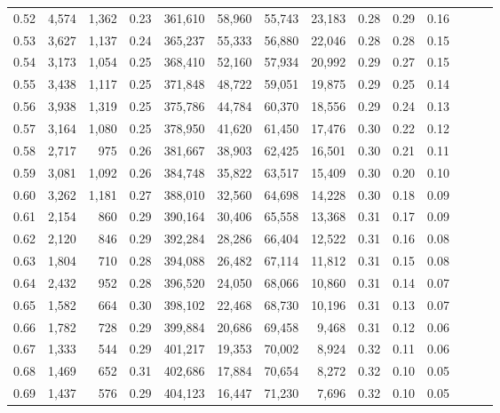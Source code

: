 \begin{tabular}{rrrrrrrrrrrrrr}
0.52 &   4,574 &  1,362 &  0.23 &  361,610 &   58,960 &  55,743 &  23,183 &  0.28 &  0.29 &      0.16 \\
0.53 &   3,627 &  1,137 &  0.24 &  365,237 &   55,333 &  56,880 &  22,046 &  0.28 &  0.28 &      0.15 \\
0.54 &   3,173 &  1,054 &  0.25 &  368,410 &   52,160 &  57,934 &  20,992 &  0.29 &  0.27 &      0.15 \\
0.55 &   3,438 &  1,117 &  0.25 &  371,848 &   48,722 &  59,051 &  19,875 &  0.29 &  0.25 &      0.14 \\
0.56 &   3,938 &  1,319 &  0.25 &  375,786 &   44,784 &  60,370 &  18,556 &  0.29 &  0.24 &      0.13 \\
0.57 &   3,164 &  1,080 &  0.25 &  378,950 &   41,620 &  61,450 &  17,476 &  0.30 &  0.22 &      0.12 \\
0.58 &   2,717 &    975 &  0.26 &  381,667 &   38,903 &  62,425 &  16,501 &  0.30 &  0.21 &      0.11 \\
0.59 &   3,081 &  1,092 &  0.26 &  384,748 &   35,822 &  63,517 &  15,409 &  0.30 &  0.20 &      0.10 \\
0.60 &   3,262 &  1,181 &  0.27 &  388,010 &   32,560 &  64,698 &  14,228 &  0.30 &  0.18 &      0.09 \\
0.61 &   2,154 &    860 &  0.29 &  390,164 &   30,406 &  65,558 &  13,368 &  0.31 &  0.17 &      0.09 \\
0.62 &   2,120 &    846 &  0.29 &  392,284 &   28,286 &  66,404 &  12,522 &  0.31 &  0.16 &      0.08 \\
0.63 &   1,804 &    710 &  0.28 &  394,088 &   26,482 &  67,114 &  11,812 &  0.31 &  0.15 &      0.08 \\
0.64 &   2,432 &    952 &  0.28 &  396,520 &   24,050 &  68,066 &  10,860 &  0.31 &  0.14 &      0.07 \\
0.65 &   1,582 &    664 &  0.30 &  398,102 &   22,468 &  68,730 &  10,196 &  0.31 &  0.13 &      0.07 \\
0.66 &   1,782 &    728 &  0.29 &  399,884 &   20,686 &  69,458 &   9,468 &  0.31 &  0.12 &      0.06 \\
0.67 &   1,333 &    544 &  0.29 &  401,217 &   19,353 &  70,002 &   8,924 &  0.32 &  0.11 &      0.06 \\
0.68 &   1,469 &    652 &  0.31 &  402,686 &   17,884 &  70,654 &   8,272 &  0.32 &  0.10 &      0.05 \\
0.69 &   1,437 &    576 &  0.29 &  404,123 &   16,447 &  71,230 &   7,696 &  0.32 &  0.10 &      0.05 \\

\end{tabular}
